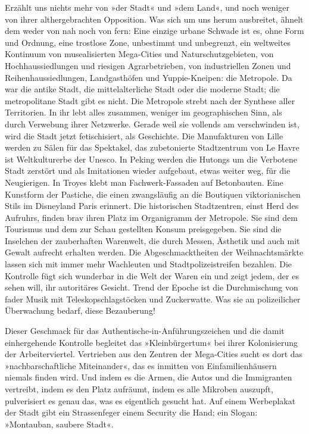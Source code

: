 Erzählt uns nichts mehr von »der Stadt« und »dem Land«, und noch
weniger von ihrer althergebrachten Opposition. Was sich um uns
herum ausbreitet, ähnelt dem weder von nah noch von fern: Eine
einzige urbane Schwade ist es, ohne Form und Ordnung, eine
trostlose Zone, unbestimmt und unbegrenzt, ein weltweites Kontinuum
von musealisierten Mega-Cities und Naturschutzgebieten, von
Hochhaussiedlungen und riesigen Agrarbetrieben, von industriellen
Zonen und Reihenhaussiedlungen, Landgasthöfen und Yuppie-Kneipen:
die Metropole. Da war die antike Stadt, die mittelalterliche Stadt
oder die moderne Stadt; die metropolitane Stadt gibt es nicht. Die
Metropole strebt nach der Synthese aller Territorien. In ihr lebt
alles zusammen, weniger im geographischen Sinn, als durch Verwebung
ihrer Netzwerke.
Gerade weil sie vollends am verschwinden ist, wird die Stadt jetzt
fetischisiert, als Geschichte. Die Manufakturen von Lille werden zu
Sälen für das Spektakel, das zubetonierte Stadtzentrum von Le Havre
ist Weltkulturerbe der Unesco. In Peking werden die Hutongs um die
Verbotene Stadt zerstört und als Imitationen wieder aufgebaut,
etwas weiter weg, für die Neugierigen. In Troyes klebt man
Fachwerk-Fassaden auf Betonbauten. Eine Kunstform der Pastiche, die
einen zwangsläufig an die Boutiquen viktorianischen Stils im
Disneyland Paris erinnert. Die historischen Stadtzentren, einst
Herd des Aufruhrs, finden brav ihren Platz im Organigramm der
Metropole. Sie sind dem Tourismus und dem zur Schau gestellten
Konsum preisgegeben. Sie sind die Inselchen der zauberhaften
Warenwelt, die durch Messen, Ästhetik und auch mit Gewalt aufrecht
erhalten werden. Die Abgeschmacktheiten der Weihnachtsmärkte lassen
sich mit immer mehr Wachleuten und Stadtpolizeistreifen bezahlen.
Die Kontrolle fügt sich wunderbar in die Welt der Waren ein und
zeigt jedem, der es sehen will, ihr autoritäres Gesicht. Trend der
Epoche ist die Durchmischung von fader Musik mit
Teleskopschlagstöcken und Zuckerwatte. Was sie an polizeilicher
Überwachung bedarf, diese Bezauberung!

Dieser Geschmack für das Authentische-in-Anführungszeichen und die
damit einhergehende Kontrolle begleitet das »Kleinbürgertum« bei
ihrer Kolonisierung der Arbeiterviertel. Vertrieben aus den Zentren
der Mega-Cities sucht es dort das »nachbarschaftliche Miteinander«,
das es inmitten von Einfamilienhäusern niemals finden wird. Und
indem es die Armen, die Autos und die Immigranten vertreibt, indem
es den Platz aufräumt, indem es alle Mikroben auszupft,
pulverisiert es genau das, was es eigentlich gesucht hat. Auf einem
Werbeplakat der Stadt gibt ein Strassenfeger einem Security die
Hand; ein Slogan: »Montauban, saubere Stadt«.


